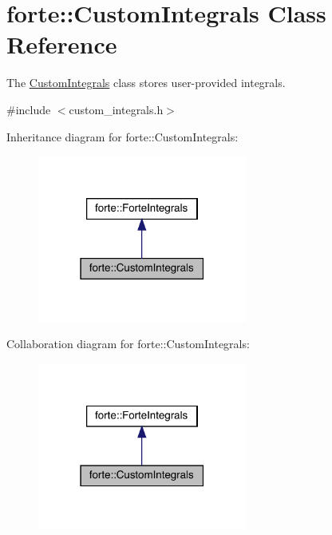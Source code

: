 \hypertarget{classforte_1_1_custom_integrals}{}\section{forte\+:\+:Custom\+Integrals Class Reference}
\label{classforte_1_1_custom_integrals}


The \mbox{\hyperlink{classforte_1_1_custom_integrals}{Custom\+Integrals}} class stores user-\/provided integrals.  




{\ttfamily \#include $<$custom\+\_\+integrals.\+h$>$}



Inheritance diagram for forte\+:\+:Custom\+Integrals\+:
\nopagebreak
\begin{figure}[H]
\begin{center}
\leavevmode
\includegraphics[width=195pt]{classforte_1_1_custom_integrals__inherit__graph}
\end{center}
\end{figure}


Collaboration diagram for forte\+:\+:Custom\+Integrals\+:
\nopagebreak
\begin{figure}[H]
\begin{center}
\leavevmode
\includegraphics[width=195pt]{classforte_1_1_custom_integrals__coll__graph}
\end{center}
\end{figure}
